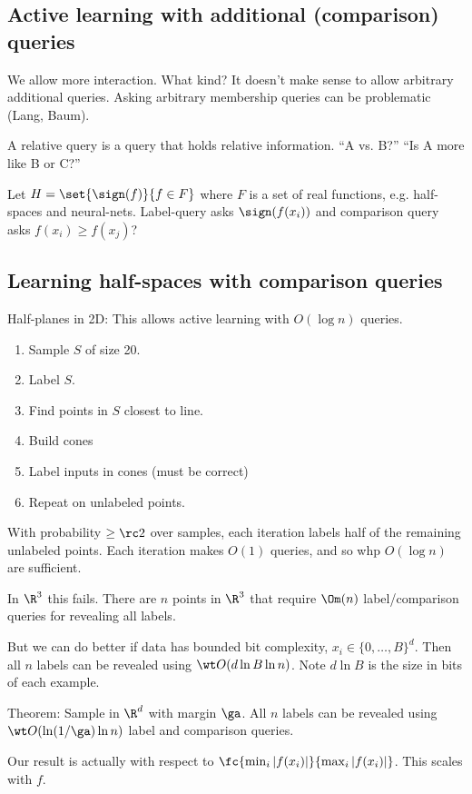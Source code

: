 \subsection{Active learning with additional (comparison) queries}
We allow more interaction. What kind? It doesn't make sense to allow arbitrary additional queries. Asking arbitrary membership queries can be problematic (Lang, Baum).

A relative query is a query that holds relative information. ``A vs. B?'' ``Is A more like B or C?''

Let $H=\set{\sign(f)}{f\in F}$ where $F$ is a set of real functions, e.g. half-spaces and neural-nets. Label-query asks $\sign(f(x_i))$ and comparison query asks $f(x_i)\ge f(x_j)$?



\subsection{Learning half-spaces with comparison queries}

Half-planes in 2D: 
This allows active learning with $O(\log n)$ queries. 
\begin{enumerate}
\item
Sample $S$ of size 20.
\item
Label $S$.
\item
Find points in $S$ closest to line.
\item
Build cones
\item
Label inputs in cones (must be correct)
\item
Repeat on unlabeled points.
\end{enumerate}
With probability $\ge \rc2 $ over samples, each iteration labels half of the remaining unlabeled points. Each iteration makes $O(1)$ queries, and so whp $O(\log n)$ are sufficient.

In $\R^3$ this fails. There are $n$ points in $\R^3$ that require $\Om(n)$ label/comparison queries for revealing all labels.

But we can do better if data has bounded bit complexity, $x_i\in \{0,\ldots, B\}^d$. Then all $n$ labels can be revealed using $\wt O(d\ln B\ln n)$. Note $d\ln B$ is the size in bits of each example.

Theorem: Sample in $\R^d$ with margin $\ga$. All $n$ labels can be revealed using $\wt O(\ln(1/\ga) \ln n)$ label and comparison queries.

Our result is actually with respect to $\fc{\min_i |f(x_i)|}{\max_i |f(x_i)|}$. This scales with $f$. 

